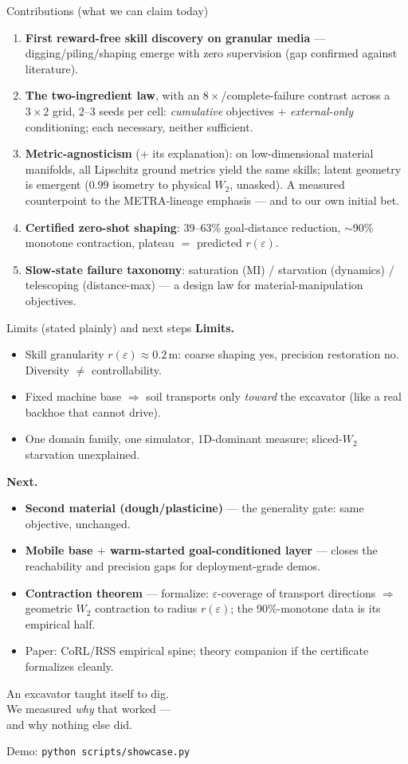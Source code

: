 \documentclass[aspectratio=169,11pt]{beamer}
\begin{document}
\begin{frame}{Contributions (what we can claim today)}
\begin{enumerate}
  \item \textbf{First reward-free skill discovery on granular media} --- digging/piling/shaping emerge with zero supervision (gap confirmed against literature).
  \item \textbf{The two-ingredient law}, with an $8\times$/complete-failure contrast across a $3\times2$ grid, 2--3 seeds per cell: \emph{cumulative} objectives $+$ \emph{external-only} conditioning; each necessary, neither sufficient.
  \item \textbf{Metric-agnosticism} (+ its explanation): on low-dimensional material manifolds, all Lipschitz ground metrics yield the same skills; latent geometry is emergent ($0.99$ isometry to physical $W_2$, unasked). A measured counterpoint to the METRA-lineage emphasis --- and to our own initial bet.
  \item \textbf{Certified zero-shot shaping}: 39--63\% goal-distance reduction, $\sim$90\% monotone contraction, plateau $=$ predicted $r(\varepsilon)$.
  \item \textbf{Slow-state failure taxonomy}: saturation (MI) / starvation (dynamics) / telescoping (distance-max) --- a design law for material-manipulation objectives.
\end{enumerate}
\end{frame}

\begin{frame}{Limits (stated plainly) and next steps}
\textbf{Limits.}
\begin{itemize}
  \item Skill granularity $r(\varepsilon)\approx0.2$\,m: coarse shaping yes, precision restoration no. Diversity $\neq$ controllability.
  \item Fixed machine base $\Rightarrow$ soil transports only \emph{toward} the excavator (like a real backhoe that cannot drive).
  \item One domain family, one simulator, 1D-dominant measure; sliced-$W_2$ starvation unexplained.
\end{itemize}
\textbf{Next.}
\begin{itemize}
  \item \textbf{Second material (dough/plasticine)} --- the generality gate: same objective, unchanged.
  \item \textbf{Mobile base $+$ warm-started goal-conditioned layer} --- closes the reachability and precision gaps for deployment-grade demos.
  \item \textbf{Contraction theorem} --- formalize: $\varepsilon$-coverage of transport directions $\Rightarrow$ geometric $W_2$ contraction to radius $r(\varepsilon)$; the 90\%-monotone data is its empirical half.
  \item Paper: CoRL/RSS empirical spine; theory companion if the certificate formalizes cleanly.
\end{itemize}
\end{frame}

\begin{frame}[standout]
  An excavator taught itself to dig.\\
  We measured \emph{why} that worked ---\\ and why nothing else did.
  \vspace{4mm}

  {\small Demo: \texttt{python scripts/showcase.py}}
\end{frame}
\end{document}

